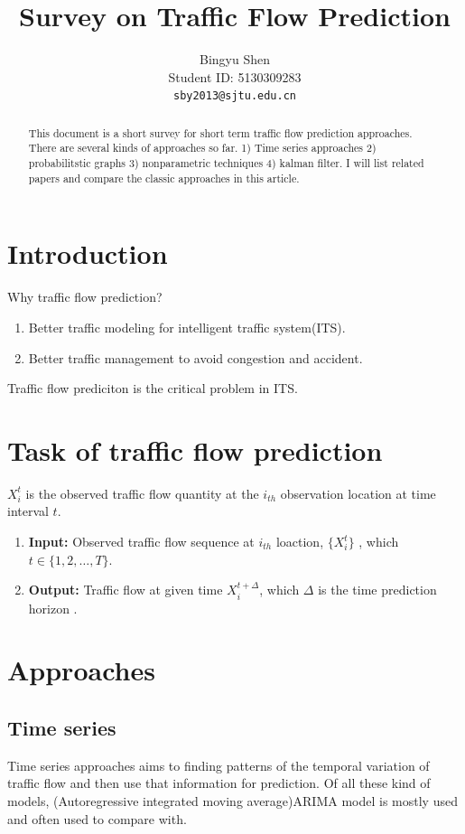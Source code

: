 \documentclass[11pt]{article}
\title{Survey on Traffic Flow Prediction}
\author{Bingyu Shen \\
  Student ID: 5130309283\\
    {\tt sby2013@sjtu.edu.cn}
}
\date{}
\begin{document}
\maketitle
\begin{abstract}
  This document is a short survey for short term traffic flow prediction approaches. There are several kinds of approaches so far. 1) Time series approaches 2) probabilitstic graphs 3) nonparametric techniques 4) kalman filter. I will list related papers and compare the classic approaches in this article.
\end{abstract}

\section{Introduction}
Why traffic flow prediction?
\begin{enumerate}
	\item Better traffic modeling for intelligent traffic system(ITS).
	\item Better traffic management to avoid congestion and accident.
\end{enumerate}

Traffic flow prediciton is the critical problem in ITS.
\section{Task of traffic flow prediction}
$X_i^t$ is the observed traffic flow quantity at the $i_{th}$ observation location at time interval $t$.
\begin{enumerate}
	\item \textbf{Input:} Observed traffic flow sequence at $i_{th}$ loaction, $\{X_i^t\}$ , which $t \in \{1,2,\dots, T\} $.
	
	\item \textbf{Output:} Traffic flow at given time $X_i^{t+\Delta}$, which $\Delta$ is the time prediction horizon . 
\end{enumerate}


\section{Approaches}
\subsection{Time series}
Time series approaches aims to finding patterns of the temporal variation of traffic flow and then use that information for prediction. Of all these kind of models, (Autoregressive integrated moving average)ARIMA model is mostly used and often used to compare with.
\end{document}
